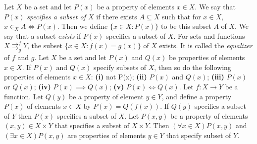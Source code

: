  Let $X$ be a set and let $P(x)$ be a property of elements $x \in X$. We say that $P(x)$ \textit{specifies a subset of $X$} if there exists $A \subseteq X$ such that for $x \in X$, $x \in_X A \iff P(x)$. Then we define $\{x \in X \colon P(x) \}$ to be this subset $A$ of $X$. We say that a subset \textit{exists} if $P(x)$ specifies a subset of $X$.
 For sets and functions $X \rightrightarrows^f_g Y$, the subset $\{x \in X \colon f(x) = g(x) \}$ of $X$ exists. It is called the \textit{equalizer} of $f$ and $g$.
 Let $X$ be a set and let $P(x)$ and $Q(x)$ be properties of elements $x \in X$. If $P(x)$ and $Q(x)$ specify subsets of $X$, then so do the following properties of elements $x \in X$: \textbf{(i)} not P(x); \textbf{(ii)} $P(x)$ and $Q(x)$; \textbf{(iii)} $P(x)$ or $Q(x)$; \textbf{(iv)} $P(x) \implies Q(x)$; \textbf{(v)} $P(x) \iff Q(x)$.
 Let $f \colon X \to Y$ be a function. Let $Q(y)$ be a property of element $y \in Y$, and define a property $P(x)$ of elements $x \in X$ by $P(x) = Q(f(x))$. If $Q(y)$ specifies a subset of $Y$ then $P(x)$ specifies a subset of $X$.
 Let $P(x, y)$ be a property of elements $(x, y) \in X \times Y$ that specifies a subset of $X \times Y$. Then $(\forall x \in X)P(x, y)$ and $(\exists x \in X)P(x, y)$ are properties of elements $y \in Y$ that specify subset of $Y$.
